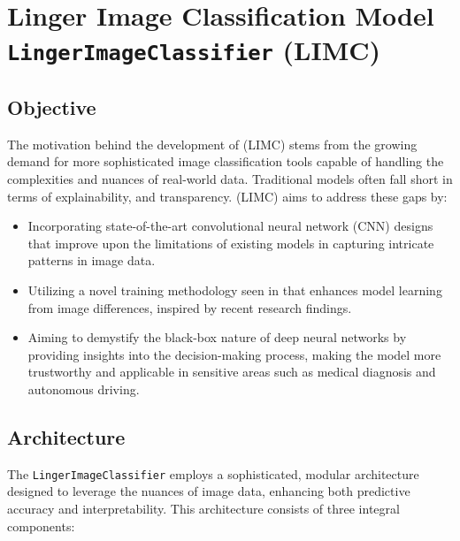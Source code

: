 \documentclass[a4paper, 12pt]{report}
\begin{document}
\section{Linger Image Classification Model \texttt{LingerImageClassifier} (LIMC)}
\label{sec:lingerImage_Classifier_model}
\subsection{Objective}
The motivation behind the development of (LIMC) stems from the growing demand for more sophisticated image classification tools capable of handling 
the complexities and nuances of real-world data. Traditional models often fall short in terms of explainability, and transparency. 
(LIMC) aims to address these gaps by:

\begin{itemize}
    \item Incorporating state-of-the-art convolutional neural network (CNN) designs that improve upon the limitations of existing models in capturing intricate patterns in image data.
    \item Utilizing a novel training methodology seen in \cite{learningFromDifferences2022} that enhances model learning from image differences, inspired by recent research findings.
    \item Aiming to demystify the black-box nature of deep neural networks by providing insights into the decision-making process, making the model more trustworthy and applicable in sensitive 
    areas such as medical diagnosis and autonomous driving.
\end{itemize}

\subsection{Architecture}
\label{sec:image_class_reg_architecture}
The \texttt{LingerImageClassifier} employs a sophisticated, modular architecture designed to leverage the nuances of image data, 
enhancing both predictive accuracy and interpretability. 
This architecture consists of three integral components:
\end{document}
